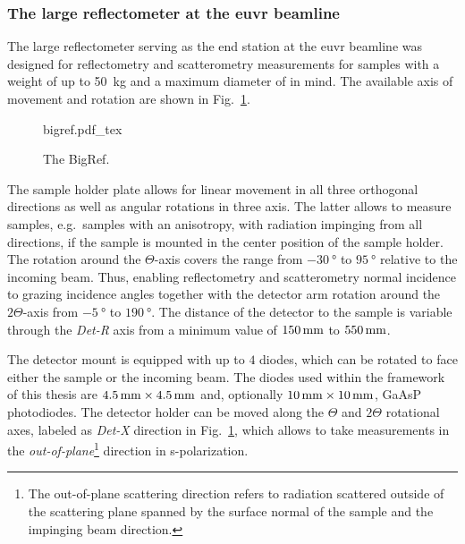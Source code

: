 \subsubsection{The large reflectometer at the \gls{euvr} beamline}
The large reflectometer serving as the end station at the \gls{euvr} beamline was designed for reflectometry and scatterometry measurements for samples with a weight of up to \SI{50}{\kg} and a maximum diameter of  in mind\cite{tummler_characterization_2003}. The available axis of movement and rotation are shown in Fig.~\ref{ch_exp:fig_bigref}.
\begin{figure}[htb]
    \def\svgwidth{\textwidth}
    {bigref.pdf_tex}
    \caption[The BigRef.]{The BigRef.}
    \label{ch_exp:fig_bigref}
\end{figure}
The sample holder plate allows for linear movement in all three orthogonal directions as well as angular rotations in three axis. The latter allows to measure samples, e.g.~samples with an anisotropy, with radiation impinging from all directions, if the sample is mounted in the center position of the sample holder. The rotation around the $\Theta$-axis covers the range from $\SI{-30}{\degree}$ to $\SI{95}{\degree}$ relative to the incoming beam. Thus, enabling reflectometry and scatterometry  normal incidence to grazing incidence angles together with the detector arm rotation around the $2\Theta$-axis from $\SI{-5}{\degree}$ to $\SI{190}{\degree}$. The distance of the detector to the sample is variable through the \emph{Det-R} axis from a minimum value of $\mm{150}$ to $\mm{550}$.

The detector mount is equipped with up to $4$ diodes, which can be rotated to face either the sample or the incoming beam. The diodes used within the framework of this thesis are $\mm{4.5} \times \mm{4.5}$ and, optionally $\mm{10} \times \mm{10}$, GaAsP photodiodes. The detector holder can be moved along the $\Theta$ and $2\Theta$ rotational axes, labeled as \emph{Det-X} direction in Fig.~\ref{ch_exp:fig_bigref}, which allows to take measurements in the \emph{out-of-plane}\footnote{The out-of-plane scattering direction refers to radiation scattered outside of the scattering plane spanned by the surface normal of the sample and the impinging beam direction.} direction in s-polarization.

